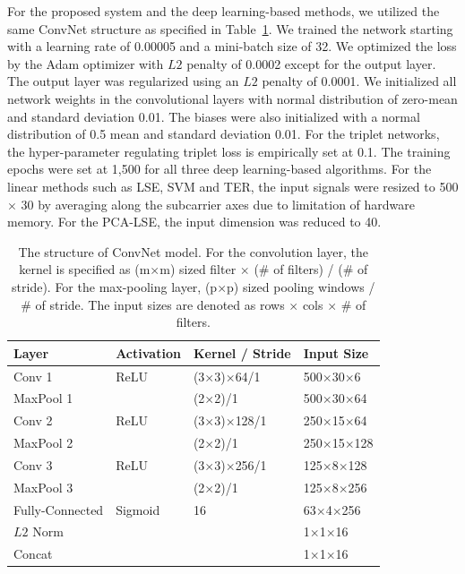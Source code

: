 \documentclass{sig-alternate-05-2015}
\begin{document}
For the proposed system and the deep learning-based methods, we utilized the same ConvNet structure as specified in Table~\ref{tab1}. We trained the network starting with a learning rate of 0.00005 and a mini-batch size of 32. We optimized the loss by the Adam optimizer with $L2$ penalty of 0.0002 except for the output layer. The output layer was regularized using an $L2$ penalty of 0.0001. We initialized all network weights in the convolutional layers with normal distribution of zero-mean and standard deviation 0.01. The biases were also initialized with a normal distribution of 0.5 mean and standard deviation 0.01. For the triplet networks, the hyper-parameter regulating triplet loss is empirically set at 0.1. The training epochs were set at 1,500 for all three deep learning-based algorithms. For the linear methods such as LSE, SVM and TER, the input signals were resized to 500 $\times$ 30 by averaging along the subcarrier axes due to limitation of hardware memory. For the PCA-LSE, the input dimension was reduced to 40.
\begin{table}
\centering
    \caption{The structure of ConvNet model. For the convolution layer, the kernel is specified as (m$\times$m) sized filter $\times$ (\# of filters) / (\# of stride). For the max-pooling layer, (p$\times$p) sized pooling windows / \# of stride. The input sizes are denoted as rows $\times$ cols $\times$ \# of filters.}
    \label{tab1}
    \begin{tabular}{|l|l|l|l|} \hline
     Layer     & Activation & Kernel / Stride & Input Size \\ \hline
     Conv 1    & ReLU       & (3$\times$3)$\times$64/1      & 500$\times$30$\times$6   \\ \hline
     MaxPool 1 &            & (2$\times$2)/1         & 500$\times$30$\times$64  \\ \hline
     Conv 2    & ReLU       & (3$\times$3)$\times$128/1     & 250$\times$15$\times$64 \\ \hline
     MaxPool 2 &            & (2$\times$2)/1         & 250$\times$15$\times$128 \\ \hline
     Conv 3    & ReLU       & (3$\times$3)$\times$256/1     & 125$\times$8$\times$128  \\ \hline
     MaxPool 3 &            & (2$\times$2)/1         & 125$\times$8$\times$256  \\ \hline
     Fully-Connected     & Sigmoid    & 16             & 63$\times$4$\times$256   \\ \hline
     $L2$ Norm  &            &                 & 1$\times$1$\times$16    \\ \hline
     Concat    &            &                 & 1$\times$1$\times$16    \\ \hline
    \end{tabular}
\end{table}
\end{document}
